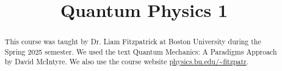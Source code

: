 \documentclass[11pt, letterpaper]{report}
\title{Quantum Physics 1}
\begin{document}
    \maketitle
    \begin{abstract}
	    This course was taught by Dr. Liam Fitzpatrick at Boston University during the Spring 2025 semester. We used the text Quantum Mechanics: A Paradigms Approach by David McIntyre. We also use the course website \url{physics.bu.edu/~fitzpatr}.
    \end{abstract}
    \tableofcontents
    
    
    
    
    
    
    
    
    
    
    
    
    
    
    
    
    
    
    
    
    
    
    
    
    
\end{document}
